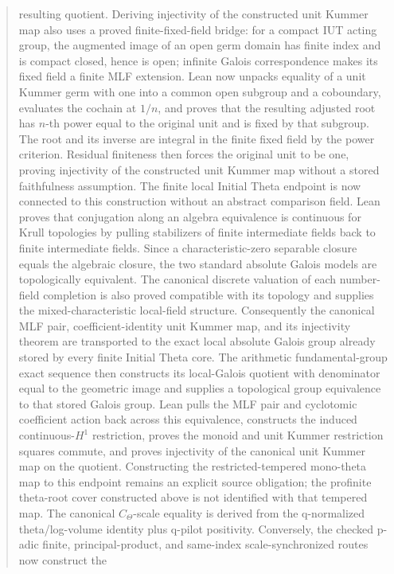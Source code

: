 \documentclass[11pt]{article}
\theoremstyle{plain}
\theoremstyle{definition}
\theoremstyle{remark}
\begin{document}
\begin{abstract}
resulting quotient.  Deriving injectivity of the constructed unit Kummer map
also uses a proved finite-fixed-field bridge: for a compact IUT acting group,
the augmented image of an open germ domain has finite index and is compact
closed, hence is open; infinite Galois correspondence makes its fixed field a
finite MLF extension.  Lean now unpacks equality of a unit Kummer germ with
one into a common open subgroup and a coboundary, evaluates the cochain at
\(1/n\), and proves that the resulting adjusted root has \(n\)-th power equal
to the original unit and is fixed by that subgroup.  The root and its inverse
are integral in the finite fixed field by the power criterion.  Residual
finiteness then forces the original unit to be one, proving injectivity of the
constructed unit Kummer map without a stored faithfulness assumption.
The finite local Initial Theta endpoint is now connected to this construction
without an abstract comparison field.  Lean proves that conjugation along an
algebra equivalence is continuous for Krull topologies by pulling stabilizers
of finite intermediate fields back to finite intermediate fields.  Since a
characteristic-zero separable closure equals the algebraic closure, the two
standard absolute Galois models are topologically equivalent.  The canonical
discrete valuation of each number-field completion is also proved compatible
with its topology and supplies the mixed-characteristic local-field structure.
Consequently the canonical MLF pair, coefficient-identity unit Kummer map, and
its injectivity theorem are transported to the exact local absolute Galois
group already stored by every finite Initial Theta core.  The arithmetic
fundamental-group exact sequence then constructs its local-Galois quotient
with denominator equal to the geometric image and supplies a topological group
equivalence to that stored Galois group.  Lean pulls the MLF pair and
cyclotomic coefficient action back across this equivalence, constructs the
induced continuous-\(H^1\) restriction, proves the monoid and unit Kummer
restriction squares commute, and proves injectivity of the canonical unit
Kummer map on the quotient.  Constructing the restricted-tempered mono-theta
map to this endpoint remains an explicit source obligation; the profinite
theta-root cover constructed above is not identified with that tempered map.
The canonical
\(C_\Theta\)-scale equality is derived from the q-normalized theta/log-volume
identity plus q-pilot positivity.  Conversely, the checked p-adic finite,
principal-product, and same-index scale-synchronized routes now construct the

\end{abstract}
\end{document}
